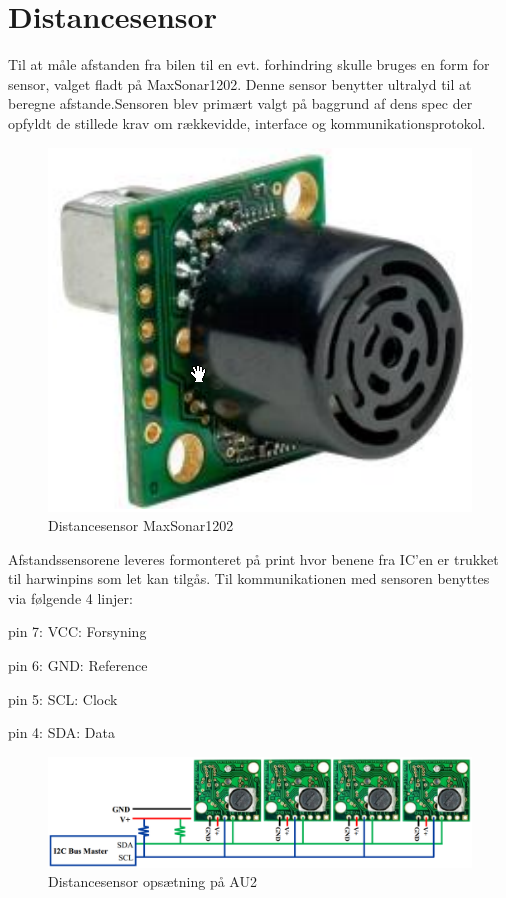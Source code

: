 \section{Distancesensor} \label{sec:hw_design_distancesensor}

Til at måle afstanden fra bilen til en evt. forhindring skulle bruges en form for sensor, valget fladt på MaxSonar1202. Denne sensor benytter ultralyd til at beregne afstande.Sensoren blev primært valgt på baggrund af dens spec der opfyldt de stillede krav om rækkevidde, interface og kommunikationsprotokol. 

\begin{figure}[ht]
	\centering
	\includegraphics[scale=0.4]{../fig/billeder/distancesensor.png}
	\caption{Distancesensor MaxSonar1202}
	\label{fig:ds_pic}
\end{figure}

Afstandssensorene leveres formonteret på print hvor benene fra IC'en er trukket til harwinpins som let kan tilgås. Til kommunikationen med sensoren benyttes \IIC via følgende 4 linjer: \\

\begin{packed_item}
	\item pin 7: VCC: Forsyning
	\item pin 6: GND: Reference
	\item pin 5: SCL: Clock
	\item pin 4: SDA: Data
\end{packed_item}

\begin{figure}[ht]
	\centering
	\includegraphics[scale=0.45]{../fig/billeder/distancesensor_multi.png}
	\caption{Distancesensor opsætning på AU2}
	\label{fig:ds_multi}
\end{figure}

